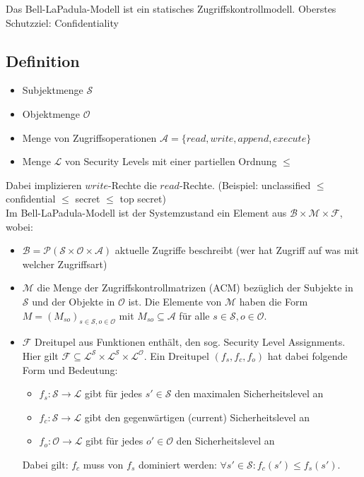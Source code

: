 \documentclass[a4paper,twoside,DIV15,BCOR12mm]{scrbook}
\begin{document}
Das Bell-LaPadula-Modell ist ein statisches Zugriffskontrollmodell. Oberstes Schutzziel: Confidentiality

\subsection{Definition}

\begin{itemize}
	\item Subjektmenge $\mathcal{S}$
	\item Objektmenge $\mathcal{O}$
	\item Menge von Zugriffsoperationen $\mathcal{A} = \{ read, write, append, execute \}$
	\item Menge $\mathcal{L}$ von Security Levels mit einer partiellen Ordnung $\leq$
\end{itemize}

Dabei implizieren $write$-Rechte die $read$-Rechte. (Beispiel: unclassified $\leq$ confidential $\leq$ secret $\leq$ top secret)\\

Im Bell-LaPadula-Modell ist der Systemzustand ein Element aus $\mathcal{B} \times \mathcal{M} \times \mathcal{F}$, wobei:

\begin{itemize}
	\item $\mathcal{B} = \mathcal{P}(\mathcal{S} \times \mathcal{O} \times \mathcal{A})$ aktuelle Zugriffe beschreibt (wer hat Zugriff auf was mit welcher Zugriffsart)
	\item $\mathcal{M}$ die Menge der Zugriffskontrollmatrizen (ACM) bezüglich der Subjekte in $\mathcal{S}$ und der Objekte in $\mathcal{O}$ ist. Die Elemente von $\mathcal{M}$ haben die Form $M = (M_{so})_{s \in \mathcal{S}, o \in \mathcal{O}}$ mit $M_{so} \subseteq \mathcal{A}$ für alle $s \in \mathcal{S}, o \in \mathcal{O}$.
	\item $\mathcal{F}$ Dreitupel aus Funktionen enthält, den sog. Security Level Assignments. Hier gilt $\mathcal{F} \subseteq \mathcal{L}^\mathcal{S} \times \mathcal{L}^\mathcal{S} \times \mathcal{L}^\mathcal{O}$. Ein Dreitupel $(f_s, f_c, f_o)$ hat dabei folgende Form und Bedeutung:
		\begin{itemize}
			\item $f_s \colon \mathcal{S} \rightarrow \mathcal{L}$ gibt für jedes $s' \in \mathcal{S}$ den maximalen Sicherheitslevel an
			\item $f_c \colon \mathcal{S} \rightarrow \mathcal{L}$ gibt den gegenwärtigen (current) Sicherheitslevel an
			\item $f_o \colon \mathcal{O} \rightarrow \mathcal{L}$ gibt für jedes $o' \in \mathcal{O}$ den Sicherheitslevel an
		\end{itemize}
		Dabei gilt: $f_c$ muss von $f_s$ dominiert werden: $\forall s' \in \mathcal{S} \colon f_c(s') \leq f_s(s')$.
\end{itemize}
\end{document}

